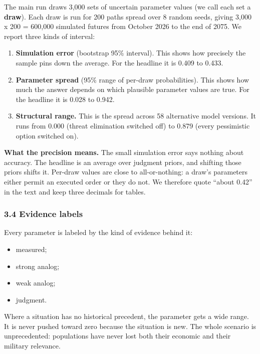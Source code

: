 \documentclass[
  10pt,
]{article}
\providecommand{\tightlist}{%
  \setlength{\itemsep}{0pt}\setlength{\parskip}{0pt}}
\begin{document}
The main run draws 3,000 sets of uncertain parameter values (we call each set a \textbf{draw}). Each
draw is run for 200 paths spread over 8 random seeds, giving 3,000 x 200 = 600,000 simulated futures
from October 2026 to the end of 2075. We report three kinds of interval:

\begin{enumerate}
\def\labelenumi{\arabic{enumi}.}
\tightlist
\item
  \textbf{Simulation error} (bootstrap 95\% interval). This shows how precisely the sample pins down
  the average. For the headline it is 0.409 to 0.433.
\item
  \textbf{Parameter spread} (95\% range of per-draw probabilities). This shows how much the answer
  depends on which plausible parameter values are true. For the headline it is 0.028 to 0.942.
\item
  \textbf{Structural range.} This is the spread across 58 alternative model versions. It runs from
  0.000 (threat elimination switched off) to 0.879 (every pessimistic option switched on).
\end{enumerate}

\textbf{What the precision means.} The small simulation error says nothing about accuracy. The
headline is an average over judgment priors, and shifting those priors shifts it. Per-draw values
are close to all-or-nothing: a draw's parameters either permit an executed order or they do not. We
therefore quote ``about 0.42'' in the text and keep three decimals for tables.

\subsubsection{3.4 Evidence labels}\label{evidence-labels}

Every parameter is labeled by the kind of evidence behind it:

\begin{itemize}
\tightlist
\item
  measured;
\item
  strong analog;
\item
  weak analog;
\item
  judgment.
\end{itemize}

Where a situation has no historical precedent, the parameter gets a wide range. It is never pushed
toward zero because the situation is new. The whole scenario is unprecedented: populations have
never lost both their economic and their military relevance.
\end{document}
